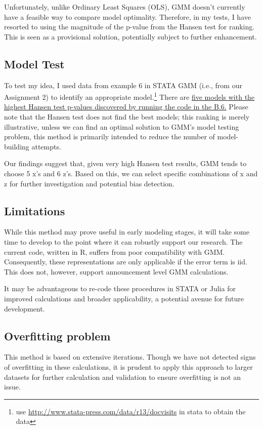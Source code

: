 \documentclass[12pt]{article}
\begin{document}
Unfortunately, unlike Ordinary Least Squares (OLS), GMM doesn't currently have a feasible way to compare model optimality. Therefore, in my tests, I have resorted to using the magnitude of the p-value from the Hansen test for ranking. This is seen as a provisional solution, potentially subject to further enhancement.


\subsection{Model Test}
To test my idea, I used data from example 6 in STATA GMM (i.e., from our Assignment 2) to identify an appropriate model.\footnote{use \url{http://www.stata-press.com/data/r13/docvisits} in stata to obtain the data} There are \hyperlink{Y}{ five models with the highest Hansen test p-values discovered by running the code in the B.6.} Please note that the Hansen test does not find the best models; this ranking is merely illustrative, unless we can find an optimal solution to GMM's model testing problem, this method is primarily intended to reduce the number of model-building attempts.

Our findings suggest that, given very high Hansen test results, GMM tends to choose 5 x's and 6 z's. Based on this, we can select specific combinations of x and z for further investigation and potential bias detection.

\subsection{Limitations}
While this method may prove useful in early modeling stages, it will take some time to develop to the point where it can robustly support our research. The current code, written in R, suffers from poor compatibility with GMM. Consequently, these representations are only applicable if the error term is iid. This does not, however, support announcement level GMM calculations.

It may be advantageous to re-code these procedures in STATA or Julia for improved calculations and broader applicability, a potential avenue for future development.

\subsection{Overfitting problem}
This method is based on extensive iterations. Though we have not detected signs of overfitting in these calculations, it is prudent to apply this approach to larger datasets for further calculation and validation to ensure overfitting is not an issue.
\end{document}
